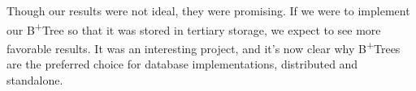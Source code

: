 \documentclass[conference]{IEEEtran}
\begin{document}
Though our results were not ideal, they were promising. If we were to implement
our B\textsuperscript{+}Tree so that it was stored in tertiary storage, we
expect to see more favorable results. It was an interesting project, and it's
now clear why B\textsuperscript{+}Trees are the preferred choice for database
implementations, distributed and standalone.





%
%
%




\end{document}
